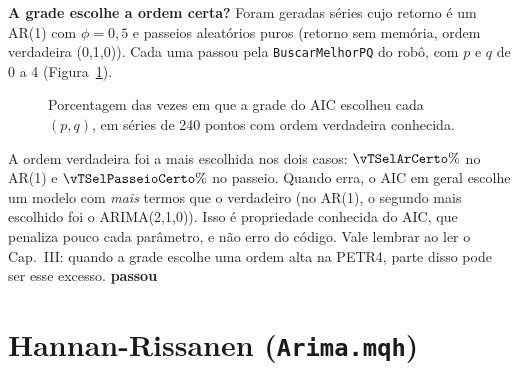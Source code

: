 \documentclass[11pt,a4paper]{article}
\newcommand{\arq}[1]{../../../dados/verificacao/testes_formulas_2026-10-30/#1}
\newcommand{\ok}{\textcolor{cok}{\textbf{passou}}}
\begin{document}
\textbf{A grade escolhe a ordem certa?} Foram geradas \vTSelArR{} séries cujo retorno é um AR(1) com
$\phi = 0{,}5$ e \vTSelPasseioR{} passeios aleatórios puros (retorno sem memória, ordem verdadeira (0,1,0)). Cada
uma passou pela \texttt{BuscarMelhorPQ} do robô, com $p$ e $q$ de 0 a 4 (Figura~\ref{fig:aic}).

\begin{figure}[htbp]
\centering
{}
\caption{Porcentagem das vezes em que a grade do AIC escolheu cada $(p, q)$, em séries de 240 pontos com ordem
verdadeira conhecida.}
\label{fig:aic}
\end{figure}

A ordem verdadeira foi a mais escolhida nos dois casos: $\vTSelArCerto\%$ no AR(1) e $\vTSelPasseioCerto\%$ no
passeio. Quando erra, o AIC em geral escolhe um modelo com \emph{mais} termos que o verdadeiro (no AR(1), o
segundo mais escolhido foi o ARIMA(2,1,0)). Isso é propriedade conhecida do AIC, que penaliza pouco cada parâmetro, e não erro do código. Vale
lembrar ao ler o Cap.~III: quando a grade escolhe uma ordem alta na PETR4, parte disso pode ser esse excesso. \ok

\section{Hannan-Rissanen (\texttt{Arima.mqh})}\label{sec:hr}
\end{document}

